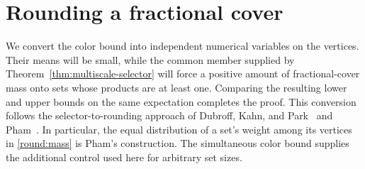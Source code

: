 \section{Rounding a fractional cover}\label{sec:rounding}

We convert the color bound into independent numerical variables on the
vertices. Their means will be small, while the common member supplied by
Theorem~\ref{thm:multiscale-selector} will force a positive amount of
fractional-cover mass onto sets whose products are at least one. Comparing
the resulting lower and upper bounds on the same expectation completes
the proof. This conversion follows the selector-to-rounding approach
of Dubroff, Kahn, and Park~\cite[Section~2]{DKP2024} and
Pham~\cite[arXiv version~1, Section~3]{Pham2024}. In particular, the
equal distribution of a set's weight among its vertices in
\eqref{round:mass} is Pham's construction. The simultaneous color
bound supplies the additional control used here for arbitrary set sizes.

